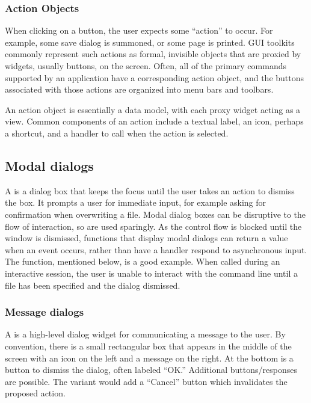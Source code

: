 \subsubsection{Action Objects}
\label{sec:GUI:actions}

When clicking on a button, the user expects some ``action'' to
occur. For example, some save dialog is summoned, or some page is
printed.  GUI toolkits commonly represent such actions as formal,
invisible objects that are proxied by widgets, usually buttons, on the
screen.  Often, all of the primary commands supported by an
application have a corresponding action object, and the buttons
associated with those actions are organized into menu bars and
toolbars.

An action object is essentially a data model, with each proxy widget
acting as a view. Common components of an action include a textual
label, an icon, perhaps a shortcut, and a handler to call
when the action is selected.


\subsection{Modal dialogs}
\label{sec:GUI:modal-dialogs}

A  is a dialog box that keeps the focus until
the user takes an action to dismiss the box. It prompts a user for
immediate input, for example asking for confirmation when overwriting
a file. Modal dialog boxes can be disruptive to the flow of
interaction, so are used sparingly. As the control flow is
blocked until the window is dismissed, functions that display modal
dialogs can return a value when an event occurs, rather than have a
handler respond to asynchronous input. The 
function, mentioned below, is a good example. When called during an
interactive \R\/ session, the user is unable to interact with the
command line until a file has been specified and the dialog dismissed.

\subsubsection{Message dialogs}
\label{sec:GUI:message-dialogs}

A  is a high-level dialog widget for
communicating a message to the user. By convention, there is a small
rectangular box that appears in the middle of the screen with an icon
on the left and a message on the right. At the bottom is a button to
dismiss the dialog, often labeled ``OK.''  Additional
buttons/responses are possible. The 
variant would add a ``Cancel'' button which invalidates the proposed
action.

